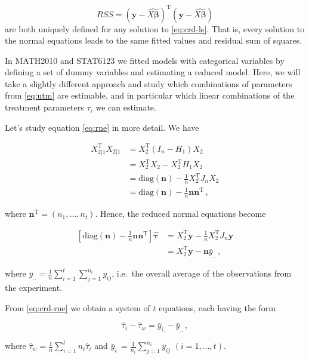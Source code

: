 \documentclass[
]{book}
\theoremstyle{definition}
\theoremstyle{definition}
\theoremstyle{definition}
\theoremstyle{definition}
\theoremstyle{remark}
\begin{document}
\[
RSS = \left(\boldsymbol{y}- \widehat{X\boldsymbol{\beta}}\right)^{\mathrm{T}}\left(\boldsymbol{y}- \widehat{X\boldsymbol{\beta}}\right)
\]
are both uniquely defined for any solution to \eqref{eq:crd-ls}. That is, every solution to the normal equations leads to the same fitted values and residual sum of squares.

In MATH2010 and STAT6123 we fitted models with categorical variables by defining a set of dummy variables and estimating a reduced model. Here, we will take a slightly different approach and study which combinations of parameters from \eqref{eq:utm} are estimable, and in particular which linear combinations of the treatment parameters \(\tau_i\) we can estimate.

Let's study equation \eqref{eq:rne} in more detail. We have

\begin{align*}
X^{\mathrm{T}}_{2|1}X_{2|1} & = X_2^{\mathrm{T}}(I_n - H_1)X_2 \\
 & = X_2^{\mathrm{T}}X_2 - X_2^{\mathrm{T}}H_1X_2 \\
 & = \mathrm{diag}(\boldsymbol{n}) - \frac{1}{n}X_2^{\mathrm{T}}J_nX_2 \\
 & = \mathrm{diag}(\boldsymbol{n}) - \frac{1}{n}\boldsymbol{n}\boldsymbol{n}^{\mathrm{T}}\,,
\end{align*}

where \(\boldsymbol{n}^{\mathrm{T}} = (n_1, \ldots, n_t)\). Hence, the reduced normal equations become

\begin{align}
\left[\mathrm{diag}(\boldsymbol{n}) - \frac{1}{n}\boldsymbol{n}\boldsymbol{n}^{\mathrm{T}}\right]\hat{\boldsymbol{\tau}} & = X_2^{\mathrm{T}}\boldsymbol{y}- \frac{1}{n}X_2^{\mathrm{T}}J_n\boldsymbol{y}\\
& = X_2^{\mathrm{T}}\boldsymbol{y}- \boldsymbol{n}\bar{y}_{..}\,,
\label{eq:crd-rne}
\end{align}

where \(\bar{y}_{..} = \frac{1}{n}\sum_{i = 1}^t\sum_{j = 1}^{n_i} y_{ij}\), i.e.~the overall average of the observations from the experiment.

From \eqref{eq:crd-rne} we obtain a system of \(t\) equations, each having the form

\begin{equation}
\hat{\tau}_i - \hat{\tau}_w = \bar{y}_{i.} - \bar{y}_{..}\,,
\label{eq:crd-irne}
\end{equation}

where \(\hat{\tau}_w = \frac{1}{n}\sum_{i=1}^tn_i\hat{\tau}_i\) and \(\bar{y}_{i.} = \frac{1}{n_i}\sum_{j = 1}^{n_i}y_{ij}\) \((i = 1, \ldots, t)\).
\end{document}
